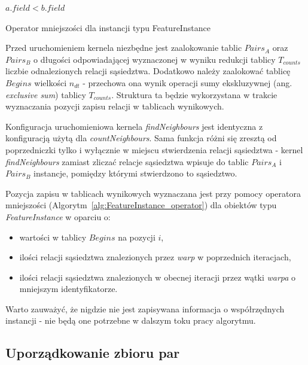 \documentclass[12pt]{article}
\begin{document}
\begin{algorithm}
 \Return $ a.field < b.field $ \; 
\caption{Operator mniejszości dla instancji typu FeatureInstance}
\label{alg:FeatureInstance_operator}
\end{algorithm}
 
Przed uruchomieniem kernela niezbędne jest zaalokowanie tablic $ Pairs_{A} $ oraz $ Pairs_{B}$ o długości odpowiadającej wyznaczonej w wyniku redukcji tablicy $ T_{counts} $ liczbie odnalezionych relacji sąsiedztwa. Dodatkowo należy zaalokować tablicę $ Begins $ wielkości $ n_{dt} $ - przechowa ona wynik operacji sumy ekskluzywnej (ang. \textit{exclusive sum}) tablicy $ T_{counts} $. Struktura ta będzie wykorzystana w trakcie wyznaczania pozycji zapisu relacji w tablicach wynikowych.

Konfiguracja uruchomieniowa kernela \textit{findNeighbours} jest identyczna z konfiguracją użytą dla \textit{countNeighbours}. Sama funkcja różni się zresztą od poprzedniczki tylko i wyłącznie w miejscu stwierdzenia relacji sąsiedztwa - kernel \textit{findNeighbours} zamiast zliczać relacje sąsiedztwa wpisuje do tablic $ Pairs_{A} $ i $ Pairs_{B}$ instancje, pomiędzy którymi stwierdzono to sąsiedztwo. 

Pozycja zapisu w tablicach wynikowych wyznaczana jest przy pomocy operatora mniejszości (Algorytm~\ref{alg:FeatureInstance_operator}) dla obiektów typu \textit{FeatureInstance} w oparciu o:

\begin{itemize}
\item wartości w tablicy $ Begins $ na pozycji $i$,
\item ilości relacji sąsiedztwa znalezionych przez \textit{warp} w poprzednich iteracjach,
\item ilości relacji sąsiedztwa znalezionych w obecnej iteracji przez wątki \textit{warpa} o mniejszym identyfikatorze. 
\end{itemize}

Warto zauważyć, że nigdzie nie jest zapisywana informacja o współrzędnych instancji - nie będą one potrzebne w dalszym toku pracy algorytmu.

\subsection{Uporządkowanie zbioru par}
\label{subsec:pair_ordering}
\end{document}
